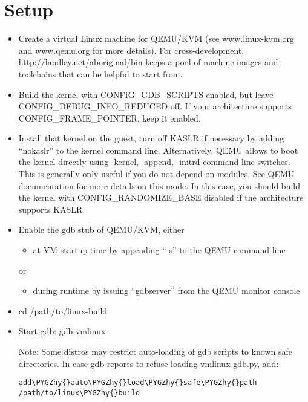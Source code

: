 \documentclass[a4paper,8pt,english]{sphinxmanual}
\def\PYGZhy{\char`\-}
\begin{document}
\section{Setup}
\label{dev-tools/gdb-kernel-debugging:setup}\begin{itemize}
\item {} 
Create a virtual Linux machine for QEMU/KVM (see www.linux-kvm.org and
www.qemu.org for more details). For cross-development,
\href{http://landley.net/aboriginal/bin}{http://landley.net/aboriginal/bin} keeps a pool of machine images and
toolchains that can be helpful to start from.

\item {} 
Build the kernel with CONFIG\_GDB\_SCRIPTS enabled, but leave
CONFIG\_DEBUG\_INFO\_REDUCED off. If your architecture supports
CONFIG\_FRAME\_POINTER, keep it enabled.

\item {} 
Install that kernel on the guest, turn off KASLR if necessary by adding
``nokaslr'' to the kernel command line.
Alternatively, QEMU allows to boot the kernel directly using -kernel,
-append, -initrd command line switches. This is generally only useful if
you do not depend on modules. See QEMU documentation for more details on
this mode. In this case, you should build the kernel with
CONFIG\_RANDOMIZE\_BASE disabled if the architecture supports KASLR.

\item {} 
Enable the gdb stub of QEMU/KVM, either
\begin{itemize}
\item {} 
at VM startup time by appending ``-s'' to the QEMU command line

\end{itemize}

or
\begin{itemize}
\item {} 
during runtime by issuing ``gdbserver'' from the QEMU monitor
console

\end{itemize}

\item {} 
cd /path/to/linux-build

\item {} 
Start gdb: gdb vmlinux

Note: Some distros may restrict auto-loading of gdb scripts to known safe
directories. In case gdb reports to refuse loading vmlinux-gdb.py, add:

\begin{Verbatim}[commandchars=\\\{\}]
add\PYGZhy{}auto\PYGZhy{}load\PYGZhy{}safe\PYGZhy{}path /path/to/linux\PYGZhy{}build
\end{Verbatim}


\end{itemize}
\end{document}
